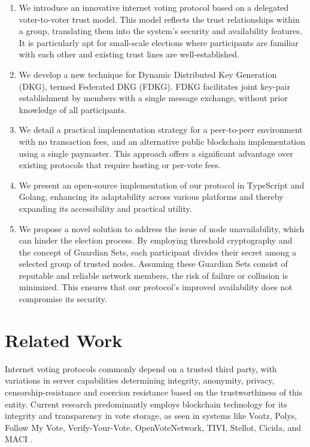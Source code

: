 \documentclass[runningheads]{llncs}
\begin{document}
\begin{enumerate}
    \item We introduce an innovative internet voting protocol based on a delegated voter-to-voter trust model. This model reflects the trust relationships within a group, translating them into the system’s security and availability features. It is particularly apt for small-scale elections where participants are familiar with each other and existing trust lines are well-established.
    
    \item We develop a new technique for Dynamic Distributed Key Generation (DKG), termed Federated DKG (FDKG). FDKG facilitates joint key-pair establishment by members with a single message exchange, without prior knowledge of all participants.
            
    \item We detail a practical implementation strategy for a peer-to-peer environment with no transaction fees, and an alternative public blockchain implementation using a single paymaster. This approach offers a significant advantage over existing protocols that require hosting or per-vote fees.

    \item We present an open-source implementation of our protocol in TypeScript and Golang, enhancing its adaptability across various platforms and thereby expanding its accessibility and practical utility.
    
    \item We propose a novel solution to address the issue of node unavailability, which can hinder the election process. By employing threshold cryptography and the concept of Guardian Sets, each participant divides their secret among a selected group of trusted nodes. Assuming these Guardian Sets consist of reputable and reliable network members, the risk of failure or collusion is minimized. This ensures that our protocol’s improved availability does not compromise its security.
\end{enumerate}


\section{Related Work}

Internet voting protocols commonly depend on a trusted third party, with variations in server capabilities determining integrity, anonymity, privacy, censorship-resistance and coercion resistance based on the trustworthiness of this entity. Current research predominantly employs blockchain technology for its integrity and transparency in vote storage, as seen in systems like Voatz, Polys, Follow My Vote, Verify-Your-Vote, OpenVoteNetwork, TIVI, Stellot, Cicida, and MACI \cite{mooreWestVirginiaMobile2019, PolysOnlineVoting, SecureDecentralizedApplication2023, chaiebVerifyYourVoteVerifiableBlockchainBased2019, haoAnonymousVotingTworound2010, mccorrySmartContractBoardroom2017, seifelnasrScalableOpenVoteNetwork2020, elsheikhDisputefreeScalableOpen2022, TIVIPoweredSmartmatic, NowYouCan2016, baranskiPracticalIVotingStellar2020, BuildingCicadaPrivate, A16zCicada2023, ethereumfoundationMinimalAntiCollusionInfrastructure2022, PrivacyscalingexplorationsMaci2023}.
\end{document}

